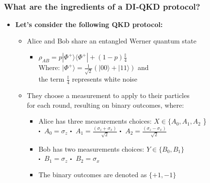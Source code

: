 \documentclass{beamer}
\newcommand\sbullet[1][.5]{\mathbin{\vcenter{\hbox{\scalebox{#1}{$\bullet$}}}}}
\begin{document}
		\begin{frame}
			\frametitle{\large What are the ingredients of a DI‑QKD protocol?}

            \vspace{3ex}
            \begin{itemize}
                \item \textbf{Let's consider the following QKD protocol:}
                \begin{itemize}
                    \item Alice and Bob share an entangled Werner quantum state
                    \begin{itemize}
                        \small
                        \item ${\rho}_{AB} = p|{\Phi}^{+}\rangle\langle{\Phi}^{+}| + (1 - p) \frac{\mathbb{I}}{4}$\\
                        \vspace{1ex}\hspace{0.5em}Where: $|{\Phi}^{+}\rangle = \frac{1}{\sqrt{2}}(|00\rangle + |11\rangle)$ and\\\hspace{3.75em}the term $\frac{\mathbb{I}}{4}$ represents white noise 
                    \end{itemize}
                    \vspace{1ex}
                    \item They choose a measurement to apply to their particles\\ for each round, resulting on binary outcomes, where:
                    \begin{itemize}
                        \item Alice has three measurements choices: $X \in \{ {A}_{0}, {A}_{1}, {A}_{2}$ \}\\
                        $\sbullet$\, ${A}_{0} = {\sigma}_{z}$ \hspace{1.25ex} $\sbullet$\, ${A}_{1} = \frac{({\sigma}_{z} + {\sigma}_{x})}{\sqrt{2}}$ \hspace{1.25ex} $\sbullet$\, ${A}_{2} = \frac{({\sigma}_{z} - {\sigma}_{x})}{\sqrt{2}}$
                        \item Bob has two measurements choices: $Y \in \{ {B}_{0}, {B}_{1} \}$\\
                        $\sbullet$\, ${B}_{1} = {\sigma}_{z}$ \hspace{1.25ex} $\sbullet$\, ${B}_{2} = {\sigma}_{x}$
                        \item The binary outcomes are denoted as $\{+1 ,-1\}$
                    \end{itemize}
                \end{itemize}
            \end{itemize}
		\end{frame}
\end{document}
